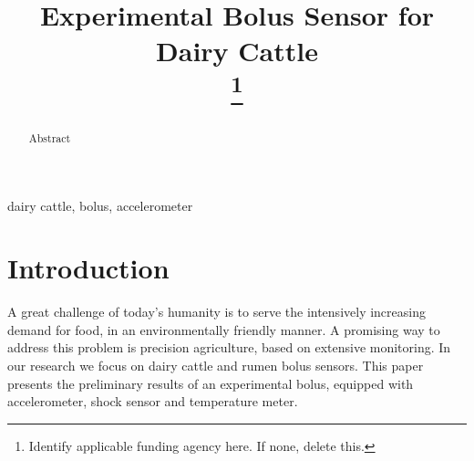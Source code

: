 \documentclass[conference]{IEEEtran}
\begin{document}
\title{Experimental Bolus Sensor for Dairy Cattle\\
\thanks{Identify applicable funding agency here. If none, delete this.}
}

\author{
\and
{}
\and
{}
}

\maketitle

\begin{abstract}
Abstract
\end{abstract}

\begin{IEEEkeywords}
dairy cattle, bolus, accelerometer
\end{IEEEkeywords}

\section{Introduction}

A great challenge of today's humanity is to serve the intensively
increasing demand for food, in an environmentally friendly manner.
A promising way to address this problem is precision agriculture,
based on extensive monitoring. In our research we focus on dairy
cattle and rumen bolus sensors. This paper presents the preliminary
results of an experimental bolus, equipped with accelerometer,
shock sensor and temperature meter.


\end{document}
